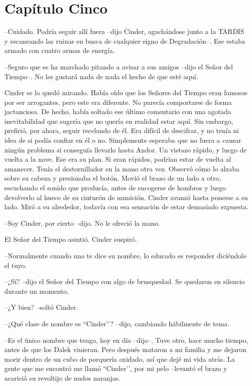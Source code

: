 \chapter*{Capítulo Cinco}

--Cuidado. Podría seguir allí fuera --dijo Cinder, agachándose junto a la TARDIS y escaneando las ruinas en busca de cualquier signo de Degradación--. Ese estaba armado con cuatro armas de energía.

--Seguro que se ha marchado pitando a avisar a sus amigos --dijo el Señor del Tiempo--. No les gustará nada de nada el hecho de que esté aquí.

Cinder se lo quedó mirando. Había oído que los Señores del Tiempo eran famosos por ser arrogantes, pero este era diferente. No parecía comportarse de forma jactanciosa. De hecho,  había soltado ese último comentario con una agotada inevitabilidad que sugería que no quería en realidad estar aquí. Sin embargo, prefirió, por ahora, seguir recelando de él. Era difícil de descifrar, y no tenía ni idea de si podía confiar en él o no. Simplemente esperaba que no fuera a causar ningún problema si conseguía llevarlo hasta Andor. Un vistazo rápido, y luego de vuelta a la nave. Ese era su plan. Si eran rápidos, podrían estar de vuelta al amanecer.
Tenía el destornillador en la mano otra vez. Observó cómo lo alzaba sobre su cabeza y presionaba el botón. Movió el brazo de un lado a otro, escuchando el sonido que producía, antes de encogerse de hombros y luego devolverlo al hueco de su cinturón de munición.
Cinder avanzó hasta ponerse a su lado. Miró a su alrededor, todavía con esa sensación de estar demasiado expuesta.

--Soy Cinder, por cierto --dijo. No le ofreció la mano.

El Señor del Tiempo asintió. Cinder suspiró.

--Normalmente cuando uno te dice su nombre, lo educado es responder diciéndole el tuyo.

--¿Sí? --dijo el Señor del Tiempo con algo de brusquedad. Se quedaron en silencio durante un momento.

--¿Y bien? --soltó Cinder.

--¿Qué clase de nombre es ``Cinder’’? --dijo, cambiando hábilmente de tema.

--Es el único nombre que tengo, hoy en día --dijo--. Tuve otro, hace mucho tiempo, antes de que los Dalek vinieran. Pero después mataron a mi familia y me dejaron morir dentro de un cubo de porquería oxidado, así que dejé mi vida atrás. La gente que me encontró me llamó “Cinder’’, por mi pelo --levantó el brazo y acarició su revoltijo de nudos naranjas.


